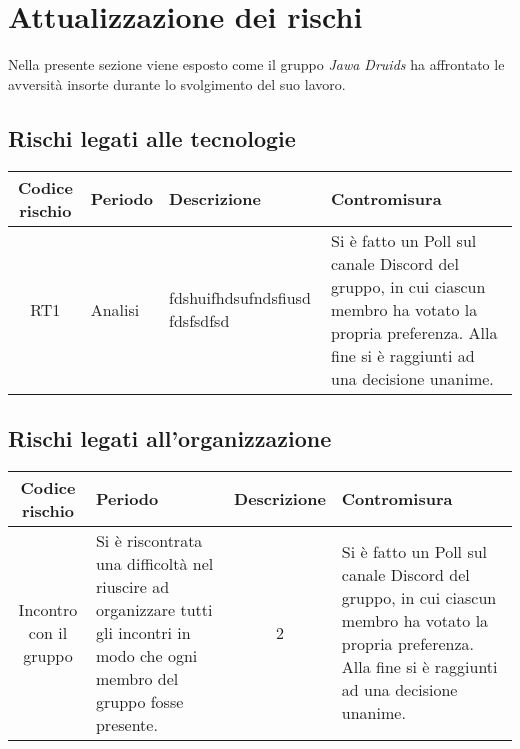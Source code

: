 \chapter{Attualizzazione dei rischi}\label{AttualizzazioneDeiRischi}
Nella presente sezione viene esposto come il gruppo \textit{Jawa Druids} ha affrontato le avversità insorte durante lo svolgimento del suo lavoro.
\section{Rischi legati alle tecnologie}\label{AttualizzazioneDeiRischilegatiAlleTecnologie}

\quad
\def\tabularxcolumn#1{m{#1}}
{
	
	\begin{center}
		\renewcommand{\arraystretch}{1.4}
		\begin{tabularx}{\textwidth}{|c|X|X|X|}
			\hline
			\rowcolor{airforceblue}
			\textbf{Codice rischio} & \textbf{Periodo} & \textbf{Descrizione} & \textbf{Contromisura}\\
			\hline
			RT1 & Analisi & fdshuifhdsufndsfiusd fdsfsdfsd & Si è fatto un Poll sul canale Discord del gruppo, in cui ciascun membro ha votato la propria preferenza. Alla fine si è raggiunti ad una decisione unanime. \\
			\hline
		\end{tabularx}
	\end{center}

\section{Rischi legati all'organizzazione}\label{AttualizzazioneDeiRischilegatiAllaOrganizzazione}

\quad
\def\tabularxcolumn#1{m{#1}}
{
	
	\begin{center}
		\renewcommand{\arraystretch}{1.4}
		\begin{tabularx}{\textwidth}{|c|X|c|X|}
			\hline
			\rowcolor{airforceblue}
			\textbf{Codice rischio} & \textbf{Periodo} & \textbf{Descrizione} & \textbf{Contromisura}\\
			\hline
			Incontro con il gruppo & Si è riscontrata una difficoltà nel riuscire ad organizzare tutti gli incontri in modo che ogni membro del gruppo fosse presente. & 2 & Si è fatto un Poll sul canale Discord del gruppo, in cui ciascun membro ha votato la propria preferenza. Alla fine si è raggiunti ad una decisione unanime. \\
			\hline
		\end{tabularx}
	\end{center}

}}

